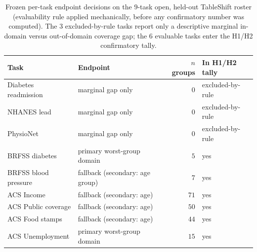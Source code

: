 \documentclass[pdflatex,sn-mathphys-num]{sn-jnl}
\begin{document}
\begin{table}[htbp]
\centering
\caption{Frozen per-task endpoint decisions on the $9$-task open, held-out TableShift roster (evaluability
rule applied mechanically, before any confirmatory number was computed). The $3$ excluded-by-rule tasks
report only a descriptive marginal in-domain versus out-of-domain coverage gap; the $6$ evaluable
tasks enter the H1/H2 confirmatory tally.}\label{tab:p5roster}
\footnotesize
\setlength{\tabcolsep}{3.5pt}
\begin{tabular}{llrl}
\toprule
Task & Endpoint & $n$ groups & In H1/H2 tally \\
\midrule
Diabetes readmission & marginal gap only & $0$ & excluded-by-rule \\
NHANES lead & marginal gap only & $0$ & excluded-by-rule \\
PhysioNet & marginal gap only & $0$ & excluded-by-rule \\
BRFSS diabetes & primary worst-group domain & $5$ & yes \\
BRFSS blood pressure & fallback (secondary: age group) & $7$ & yes \\
ACS Income & fallback (secondary: age) & $71$ & yes \\
ACS Public coverage & fallback (secondary: age) & $50$ & yes \\
ACS Food stamps & fallback (secondary: age) & $44$ & yes \\
ACS Unemployment & primary worst-group domain & $15$ & yes \\
\bottomrule
\end{tabular}
\end{table}
\end{document}
